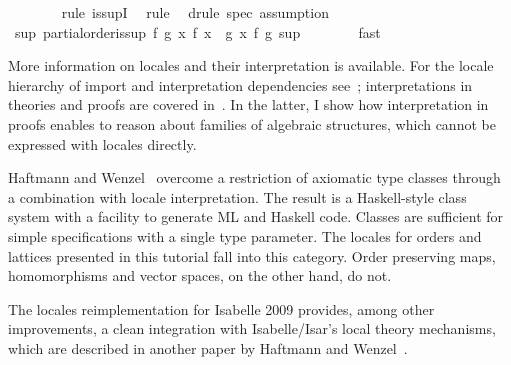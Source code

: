 \begin{isabellebody}
\ \ \ \ \ \ \isamarkupfalse%
\ {}rule\ is{}supI{}\ \isamarkupfalse%
\ rule{}\ \isamarkupfalse%
\ {}drule\ spec{}\ assumption{}{}\ \isamarkupfalse%
\isanewline
\ \ \ \ \isamarkupfalse%
\ \isamarkupfalse%
\ {}{}sup{}\ partial{}order{}is{}sup\ {}{}f\ g{}\ {}x{}\ f\ x\ {}\ g\ x{}\ f\ g\ sup{}\isanewline
\ \ \ \ \ \ \isamarkupfalse%
\ fast\isanewline
\ \ \isamarkupfalse%
%
\endisatagproof
{\isafoldproof}%
%
\isadelimproof
%
\endisadelimproof
%
\isamarkuptrue%
%
\begin{isamarkuptext}%
More information on locales and their interpretation is
  available.  For the locale hierarchy of import and interpretation
  dependencies see~\cite{Ballarin2006a}; interpretations in theories
  and proofs are covered in~\cite{Ballarin2006b}.  In the latter, I
  show how interpretation in proofs enables to reason about families
  of algebraic structures, which cannot be expressed with locales
  directly.

  Haftmann and Wenzel~\cite{HaftmannWenzel2007} overcome a restriction
  of axiomatic type classes through a combination with locale
  interpretation.  The result is a Haskell-style class system with a
  facility to generate ML and Haskell code.  Classes are sufficient for
  simple specifications with a single type parameter.  The locales for
  orders and lattices presented in this tutorial fall into this
  category.  Order preserving maps, homomorphisms and vector spaces,
  on the other hand, do not.

  The locales reimplementation for Isabelle 2009 provides, among other
  improvements, a clean integration with Isabelle/Isar's local theory
  mechanisms, which are described in another paper by Haftmann and
  Wenzel~\cite{HaftmannWenzel2009}.


\end{isamarkuptext}
\end{isabellebody}
